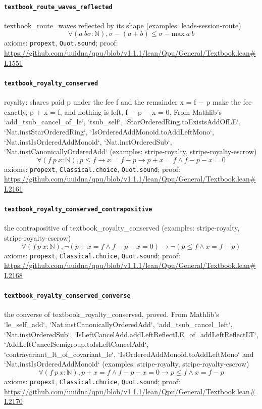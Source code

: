 \documentclass[11pt]{article}
\begin{document}
\paragraph{\texttt{textbook\_route\_waves\_reflected}}
textbook\_route\_waves reflected by its shape (examples: leads-session-route)
\[ \forall (a\ b \sigma : \mathbb{N}), \sigma - (a + b) \le \sigma - \mathrm{max}\ a\ b \]
\noindent axioms: \texttt{propext}, \texttt{Quot.sound}; proof: \url{https://github.com/uuidna/qpu/blob/v1.1.1/lean/Qpu/General/Textbook.lean\#L1551}

\paragraph{\texttt{textbook\_royalty\_conserved}}
royalty: shares paid p under the fee f and the remainder x = f − p make the fee exactly, p + x = f, and nothing is left, f − p − x = 0. From Mathlib's `add\_tsub\_cancel\_of\_le`, `tsub\_self`, `StarOrderedRing.toExistsAddOfLE`, `Nat.instStarOrderedRing`, `IsOrderedAddMonoid.toAddLeftMono`, `Nat.instIsOrderedAddMonoid`, `Nat.instOrderedSub`, `Nat.instCanonicallyOrderedAdd` (examples: stripe-royalty, stripe-royalty-escrow)
\[ \forall (f\ p\ x : \mathbb{N}), p \le f \to x = f - p \to p + x = f \land f - p - x = 0 \]
\noindent axioms: \texttt{propext}, \texttt{Classical.choice}, \texttt{Quot.sound}; proof: \url{https://github.com/uuidna/qpu/blob/v1.1.1/lean/Qpu/General/Textbook.lean\#L2161}

\paragraph{\texttt{textbook\_royalty\_conserved\_contrapositive}}
the contrapositive of textbook\_royalty\_conserved (examples: stripe-royalty, stripe-royalty-escrow)
\[ \forall (f\ p\ x : \mathbb{N}), \neg (p + x = f \land f - p - x = 0) \to \neg (p \le f \land x = f - p) \]
\noindent axioms: \texttt{propext}, \texttt{Classical.choice}, \texttt{Quot.sound}; proof: \url{https://github.com/uuidna/qpu/blob/v1.1.1/lean/Qpu/General/Textbook.lean\#L2168}

\paragraph{\texttt{textbook\_royalty\_conserved\_converse}}
the converse of textbook\_royalty\_conserved, proved. From Mathlib's `le\_self\_add`, `Nat.instCanonicallyOrderedAdd`, `add\_tsub\_cancel\_left`, `Nat.instOrderedSub`, `IsLeftCancelAdd.addLeftReflectLE\_of\_addLeftReflectLT`, `AddLeftCancelSemigroup.toIsLeftCancelAdd`, `contravariant\_lt\_of\_covariant\_le`, `IsOrderedAddMonoid.toAddLeftMono` and `Nat.instIsOrderedAddMonoid` (examples: stripe-royalty, stripe-royalty-escrow)
\[ \forall (f\ p\ x : \mathbb{N}), p + x = f \land f - p - x = 0 \to p \le f \land x = f - p \]
\noindent axioms: \texttt{propext}, \texttt{Classical.choice}, \texttt{Quot.sound}; proof: \url{https://github.com/uuidna/qpu/blob/v1.1.1/lean/Qpu/General/Textbook.lean\#L2170}
\end{document}
